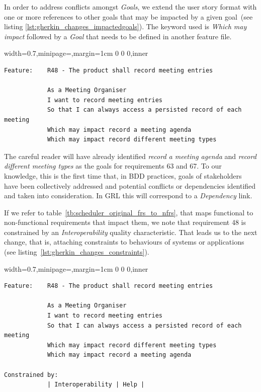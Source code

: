 \documentclass[dissertation,final]{softeng}
\newenvironment{featurecode}[1]
{ \lrbox\featurebox \begin{adjustbox}{width=#1\textwidth,minipage=\textwidth,margin=1cm 0 0 0,inner} }
{ \end{adjustbox}\endlrbox}
\newenvironment{featurelist}[2]
{
\newcommand{\setcaption}{\caption{#1}}
\newcommand{\setlabel}{\label{#2}}
}
{\begin{listing}[h!]\centering\usebox\featurebox\setcaption\setlabel\end{listing}}
\begin{document}
In order to address conflicts amongst \emph{Goals}, we extend the user story format with one or more references to other goals that may be impacted by a given goal~(see listing \ref{lst:gherkin_changes_impactedgoals}). The keyword used is \emph{Which may impact} followed by a \emph{Goal} that needs to be defined in another feature file.

\begin{featurelist}{Changes to Gherkin -- Impacted goals}{lst:gherkin_changes_impactedgoals}
\begin{featurecode}{0.7}
\begin{verbatim}
Feature:    R48 - The product shall record meeting entries

            As a Meeting Organiser
            I want to record meeting entries
            So that I can always access a persisted record of each meeting
            Which may impact record a meeting agenda
            Which may impact record different meeting types

\end{verbatim}
\end{featurecode}
\end{featurelist}

The careful reader will have already identified \emph{record a meeting agenda} and \emph{record different meeting types} as the goals for requirements 63 and 67. To our knowledge, this is the first time that, in BDD practices, goals of stakeholders have been collectively addressed and potential conflicts or dependencies identified and taken into consideration. In GRL this will correspond to a \emph{Dependency} link.

If we refer to table~\ref{tb:scheduler_original_frs_to_nfrs}, that maps functional to non-functional requirements that impact them, we note that requirement 48 is constrained by an \emph{Interoperability} quality characteristic. That leads us to the next change, that is, attaching constraints to behaviours of systems or applications (see listing~\ref{lst:gherkin_changes_constraints}).

\begin{featurelist}{Changes to Gherkin -- Constraints}{lst:gherkin_changes_constraints}
\begin{featurecode}{0.7}
\begin{verbatim}
Feature:    R48 - The product shall record meeting entries

            As a Meeting Organiser
            I want to record meeting entries
            So that I can always access a persisted record of each meeting
            Which may impact record different meeting types
            Which may impact record a meeting agenda
	
Constrained by:
            | Interoperability | Help |
\end{verbatim}
\end{featurecode}
\end{featurelist}
\end{document}
